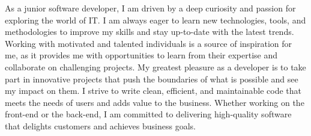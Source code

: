 

\begin{cvparagraph}

As a junior software developer, I am driven by a deep curiosity and passion for exploring the world of IT. I am always eager to learn new technologies, tools, and methodologies to improve my skills and stay up-to-date with the latest trends. Working with motivated and talented individuals is a source of inspiration for me, as it provides me with opportunities to learn from their expertise and collaborate on challenging projects. My greatest pleasure as a developer is to take part in innovative projects that push the boundaries of what is possible and see my impact on them. I strive to write clean, efficient, and maintainable code that meets the needs of users and adds value to the business. Whether working on the front-end or the back-end, I am committed to delivering high-quality software that delights customers and achieves business goals.
\end{cvparagraph}
